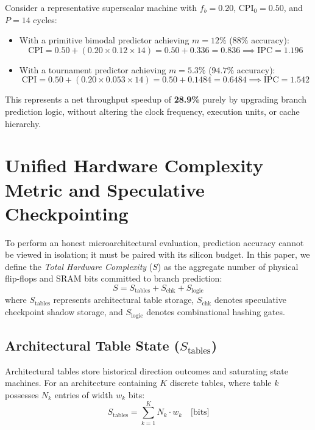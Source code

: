 \documentclass[11pt,a4paper]{article}
\begin{document}
Consider a representative superscalar machine with $f_b = 0.20$, $\text{CPI}_0 = 0.50$, and $P = 14$ cycles:
\begin{itemize}[leftmargin=1.5em, itemsep=0.3em]
    \item With a primitive bimodal predictor achieving $m = 12\%$ ($88\%$ accuracy):
    \begin{equation*}
        \text{CPI} = 0.50 + (0.20 \times 0.12 \times 14) = 0.50 + 0.336 = 0.836 \implies \text{IPC} = 1.196
    \end{equation*}
    \item With a tournament predictor achieving $m = 5.3\%$ ($94.7\%$ accuracy):
    \begin{equation*}
        \text{CPI} = 0.50 + (0.20 \times 0.053 \times 14) = 0.50 + 0.1484 = 0.6484 \implies \text{IPC} = 1.542
    \end{equation*}
\end{itemize}
This represents a net throughput speedup of \textbf{28.9\%} purely by upgrading branch prediction logic, without altering the clock frequency, execution units, or cache hierarchy.

\section{Unified Hardware Complexity Metric and Speculative Checkpointing}
\label{sec:hw_complexity}

To perform an honest microarchitectural evaluation, prediction accuracy cannot be viewed in isolation; it must be paired with its silicon budget. In this paper, we define the \textit{Total Hardware Complexity} ($S$) as the aggregate number of physical flip-flops and SRAM bits committed to branch prediction:
\begin{equation}
    S = S_{\text{tables}} + S_{\text{chk}} + S_{\text{logic}}
    \label{eq:state_total}
\end{equation}
where $S_{\text{tables}}$ represents architectural table storage, $S_{\text{chk}}$ denotes speculative checkpoint shadow storage, and $S_{\text{logic}}$ denotes combinational hashing gates.

\subsection{Architectural Table State ($S_{\text{tables}}$)}
Architectural tables store historical direction outcomes and saturating state machines. For an architecture containing $K$ discrete tables, where table $k$ possesses $N_k$ entries of width $w_k$ bits:
\begin{equation}
    S_{\text{tables}} = \sum_{k=1}^{K} N_k \cdot w_k \quad \text{[bits]}
    \label{eq:s_tables}
\end{equation}
\end{document}
